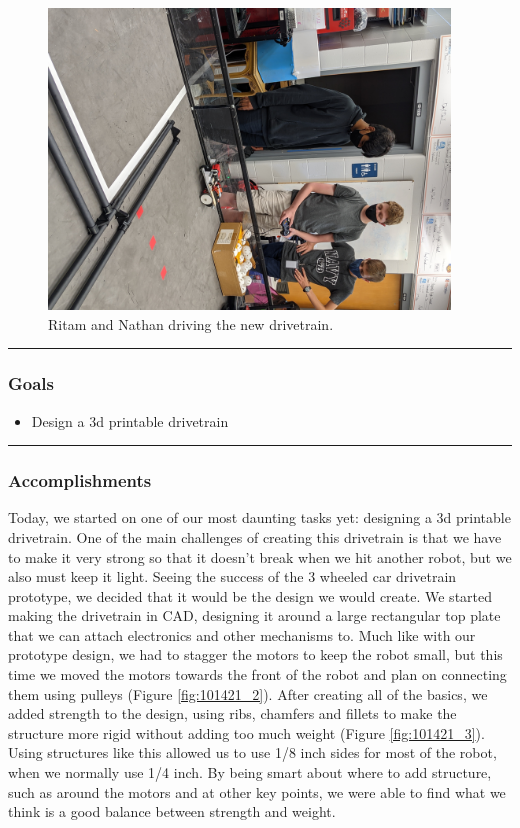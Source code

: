 \begin{figure}[htp]
\centering
\includegraphics[width=0.95\textwidth, angle=0]{Meetings/October/10-14-21/10-14-21_Team_Figure1 - Nathan Forrer.jpg}
\caption{Ritam and Nathan driving the new drivetrain.}
\label{fig:101421_1}
\end{figure}

\noindent\hfil\rule{\textwidth}{.4pt}\hfil
\subsubsection*{Goals}
\begin{itemize}
    \item Design a 3d printable drivetrain

\end{itemize} 

\noindent\hfil\rule{\textwidth}{.4pt}\hfil

\subsubsection*{Accomplishments}
Today, we started on one of our most daunting tasks yet: designing a 3d printable drivetrain. One of the main challenges of creating this drivetrain is that we have to make it very strong so that it doesn't break when we hit another robot, but we also must keep it light. Seeing the success of the 3 wheeled car drivetrain prototype, we decided that it would be the design we would create. We started making the drivetrain in CAD, designing it around a large rectangular top plate that we can attach electronics and other mechanisms to. Much like with our prototype design, we had to stagger the motors to keep the robot small, but this time we moved the motors towards the front of the robot and plan on connecting them using pulleys (Figure \ref{fig:101421_2}). After creating all of the basics, we added strength to the design, using ribs, chamfers and fillets to make the structure more rigid without adding too much weight (Figure \ref{fig:101421_3}). Using structures like this allowed us to use 1/8 inch sides for most of the robot, when we normally use 1/4 inch. By being smart about where to add structure, such as around the motors and at other key points, we were able to find what we think is a good balance between strength and weight.

